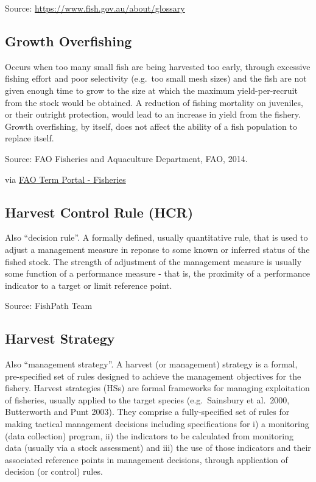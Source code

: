 \documentclass[
  11pt,
]{book}
\begin{document}
Source: \url{https://www.fish.gov.au/about/glossary}

\hypertarget{growth-overfishing}{%
\subsection{Growth Overfishing}\label{growth-overfishing}}

Occurs when too many small fish are being harvested too early, through excessive fishing effort and poor selectivity (e.g.~too small mesh sizes) and the fish are not given enough time to grow to the size at which the maximum yield-per-recruit from the stock would be obtained. A reduction of fishing mortality on juveniles, or their outright protection, would lead to an increase in yield from the fishery. Growth overfishing, by itself, does not affect the ability of a fish population to replace itself.

Source: FAO Fisheries and Aquaculture Department, FAO, 2014.

via \href{http://www.fao.org/fishery/glossary/en}{FAO Term Portal - Fisheries}

\hypertarget{harvest-control-rule-hcr}{%
\subsection{Harvest Control Rule (HCR)}\label{harvest-control-rule-hcr}}

Also ``decision rule''. A formally defined, usually quantitative rule, that is used to adjust a management measure in reponse to some known or inferred status of the fished stock. The strength of adjustment of the management measure is usually some function of a performance measure - that is, the proximity of a performance indicator to a target or limit reference point.

Source: FishPath Team

\hypertarget{harvest-strategy}{%
\subsection{Harvest Strategy}\label{harvest-strategy}}

Also ``management strategy''. A harvest (or management) strategy is a formal, pre-specified set of rules designed to achieve the management objectives for the fishery. Harvest strategies (HSs) are formal frameworks for managing exploitation of fisheries, usually applied to the target species (e.g.~Sainsbury et al.~2000, Butterworth and Punt 2003). They comprise a fully-specified set of rules for making tactical management decisions including specifications for i) a monitoring (data collection) program, ii) the indicators to be calculated from monitoring data (usually via a stock assessment) and iii) the use of those indicators and their associated reference points in management decisions, through application of decision (or control) rules.
\end{document}
